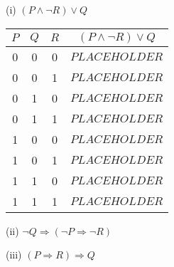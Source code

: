 \documentclass{article}
\begin{document}
(i) $(P \land \neg R) \lor Q$\\
\begin{tabular}{|c|c|c|c|}
    \hline
    $P$ & $Q$ & $R$ & $(P \land \neg R) \lor Q$ \\
    \hline
    0   & 0   & 0   & $PLACEHOLDER$             \\
    0   & 0   & 1   & $PLACEHOLDER$             \\
    0   & 1   & 0   & $PLACEHOLDER$             \\
    0   & 1   & 1   & $PLACEHOLDER$             \\
    1   & 0   & 0   & $PLACEHOLDER$             \\
    1   & 0   & 1   & $PLACEHOLDER$             \\
    1   & 1   & 0   & $PLACEHOLDER$             \\
    1   & 1   & 1   & $PLACEHOLDER$             \\
    \hline
\end{tabular}

(ii) $\neg Q \Rightarrow (\neg P \Rightarrow \neg R)$

(iii) $(P \Rightarrow R) \Rightarrow Q$
\end{document}
